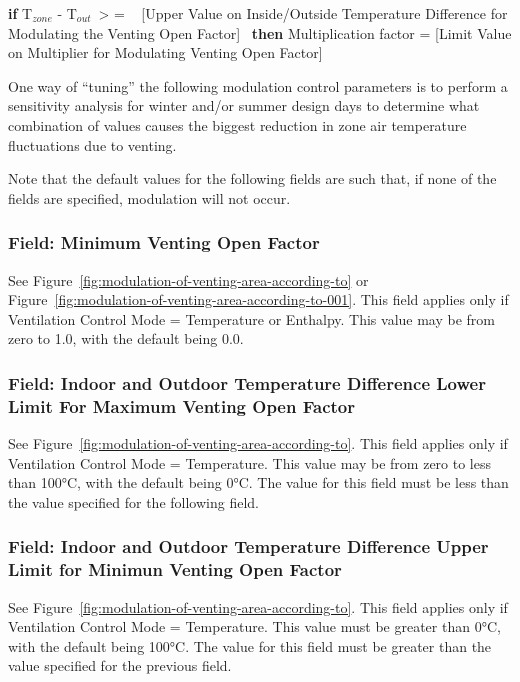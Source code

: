 \textbf{if} T\(_{zone}\) - T\(_{out}\)~\textgreater{} = ~ {[}Upper Value on Inside/Outside Temperature Difference for Modulating the Venting Open Factor{]}~ \textbf{then} Multiplication factor = {[}Limit Value on Multiplier for Modulating Venting Open Factor{]}

One way of ``tuning'' the following modulation control parameters is to perform a sensitivity analysis for winter and/or summer design days to determine what combination of values causes the biggest reduction in zone air temperature fluctuations due to venting.

Note that the default values for the following fields are such that, if none of the fields are specified, modulation will not occur.

\subsubsection{Field: Minimum Venting Open Factor}\label{field-minimum-venting-open-factor-1}

See Figure~\ref{fig:modulation-of-venting-area-according-to} or Figure~\ref{fig:modulation-of-venting-area-according-to-001}. This field applies only if Ventilation Control Mode = Temperature or Enthalpy. This value may be from zero to 1.0, with the default being 0.0.

\subsubsection{Field: Indoor and Outdoor Temperature Difference Lower Limit For Maximum Venting Open Factor}\label{field-indoor-and-outdoor-temperature-difference-lower-limit-for-maximum-venting-open-factor-1}

See Figure~\ref{fig:modulation-of-venting-area-according-to}. This field applies only if Ventilation Control Mode = Temperature. This value may be from zero to less than 100°C, with the default being 0°C. The value for this field must be less than the value specified for the following field.

\subsubsection{Field: Indoor and Outdoor Temperature Difference Upper Limit for Minimun Venting Open Factor}\label{field-indoor-and-outdoor-temperature-difference-upper-limit-for-minimun-venting-open-factor-1}

See Figure~\ref{fig:modulation-of-venting-area-according-to}. This field applies only if Ventilation Control Mode = Temperature. This value must be greater than 0°C, with the default being 100°C. The value for this field must be greater than the value specified for the previous field.

